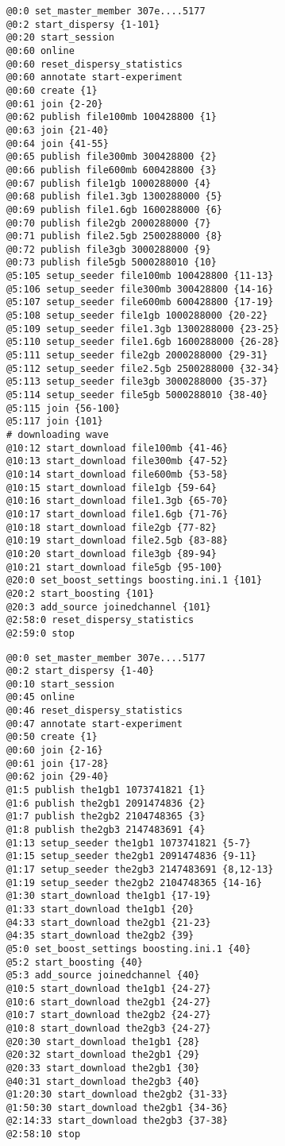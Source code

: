 \begin{appendices}
\begin{lstlisting}[caption={Scenario 4.}]
@0:0 set_master_member 307e....5177
@0:2 start_dispersy {1-101}
@0:20 start_session
@0:60 online
@0:60 reset_dispersy_statistics
@0:60 annotate start-experiment
@0:60 create {1}
@0:61 join {2-20}
@0:62 publish file100mb 100428800 {1}
@0:63 join {21-40}
@0:64 join {41-55}
@0:65 publish file300mb 300428800 {2}
@0:66 publish file600mb 600428800 {3}
@0:67 publish file1gb 1000288000 {4}
@0:68 publish file1.3gb 1300288000 {5}
@0:69 publish file1.6gb 1600288000 {6}
@0:70 publish file2gb 2000288000 {7}
@0:71 publish file2.5gb 2500288000 {8}
@0:72 publish file3gb 3000288000 {9}
@0:73 publish file5gb 5000288010 {10}
@5:105 setup_seeder file100mb 100428800 {11-13}
@5:106 setup_seeder file300mb 300428800 {14-16}
@5:107 setup_seeder file600mb 600428800 {17-19}
@5:108 setup_seeder file1gb 1000288000 {20-22}
@5:109 setup_seeder file1.3gb 1300288000 {23-25}
@5:110 setup_seeder file1.6gb 1600288000 {26-28}
@5:111 setup_seeder file2gb 2000288000 {29-31}
@5:112 setup_seeder file2.5gb 2500288000 {32-34}
@5:113 setup_seeder file3gb 3000288000 {35-37}
@5:114 setup_seeder file5gb 5000288010 {38-40}
@5:115 join {56-100}
@5:117 join {101}
# downloading wave
@10:12 start_download file100mb {41-46}
@10:13 start_download file300mb {47-52}
@10:14 start_download file600mb {53-58}
@10:15 start_download file1gb {59-64}
@10:16 start_download file1.3gb {65-70}
@10:17 start_download file1.6gb {71-76}
@10:18 start_download file2gb {77-82}
@10:19 start_download file2.5gb {83-88}
@10:20 start_download file3gb {89-94}
@10:21 start_download file5gb {95-100}
@20:0 set_boost_settings boosting.ini.1 {101}
@20:2 start_boosting {101}
@20:3 add_source joinedchannel {101}
@2:58:0 reset_dispersy_statistics
@2:59:0 stop
\end{lstlisting}

\begin{lstlisting}[caption={Scenario 5.}]
@0:0 set_master_member 307e....5177
@0:2 start_dispersy {1-40}
@0:10 start_session
@0:45 online
@0:46 reset_dispersy_statistics
@0:47 annotate start-experiment
@0:50 create {1}
@0:60 join {2-16}
@0:61 join {17-28}
@0:62 join {29-40}
@1:5 publish the1gb1 1073741821 {1}
@1:6 publish the2gb1 2091474836 {2}
@1:7 publish the2gb2 2104748365 {3}
@1:8 publish the2gb3 2147483691 {4}
@1:13 setup_seeder the1gb1 1073741821 {5-7}
@1:15 setup_seeder the2gb1 2091474836 {9-11}
@1:17 setup_seeder the2gb3 2147483691 {8,12-13}
@1:19 setup_seeder the2gb2 2104748365 {14-16}
@1:30 start_download the1gb1 {17-19}
@1:33 start_download the1gb1 {20}
@4:33 start_download the2gb1 {21-23}
@4:35 start_download the2gb2 {39}
@5:0 set_boost_settings boosting.ini.1 {40}
@5:2 start_boosting {40}
@5:3 add_source joinedchannel {40}
@10:5 start_download the1gb1 {24-27}
@10:6 start_download the2gb1 {24-27}
@10:7 start_download the2gb2 {24-27}
@10:8 start_download the2gb3 {24-27}
@20:30 start_download the1gb1 {28}
@20:32 start_download the2gb1 {29}
@20:33 start_download the2gb1 {30}
@40:31 start_download the2gb3 {40}
@1:20:30 start_download the2gb2 {31-33}
@1:50:30 start_download the2gb1 {34-36}
@2:14:33 start_download the2gb3 {37-38}
@2:58:10 stop
\end{lstlisting}

\end{appendices}